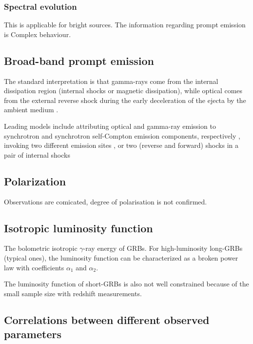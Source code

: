 
\subsubsection{Spectral evolution}
This is applicable for bright sources. The information regarding prompt emission is
Complex behaviour.


\subsection{Broad-band prompt emission}

The standard interpretation is that gamma-rays come from the internal dissipation region (internal shocks or magnetic dissipation), while optical comes from the external reverse shock during the early deceleration of the ejecta by the ambient medium \cite{(Sari and Piran, 1999a; Meszaros and Rees, 1999)}.

Leading models include attributing optical and gamma-ray emission to synchrotron and synchrotron self-Compton emission components, respectively \cite{(Kumar and Panaitescu, 2008; Racusin et al., 2008)}, invoking two different emission sites \cite{(Zou et al., 2009b; Fan et al., 2009)}, or two (reverse and forward) shocks in a pair of internal shocks \cite{(Meszaros and Rees, 1999; Yu et al., 2009)}


\subsection{Polarization}

Observations are comicated, degree of polarisation is not confirmed. 

\subsection{Isotropic luminosity function}

The bolometric isotropic $\gamma$-ray energy of GRBs.
For high-luminosity long-GRBs (typical ones), the luminosity function can be characterized as a broken power law
with coefficients $\alpha_1$ and $\alpha_2$.

The luminosity function of short-GRBs is also not well constrained because of the small sample size with redshift measurements.

\subsection{Correlations between different observed parameters}

